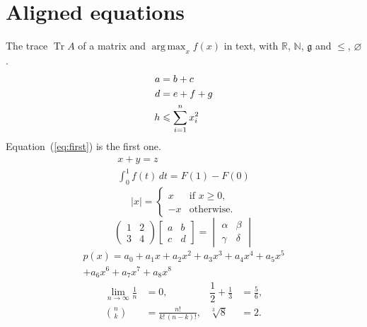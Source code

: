 \documentclass{article}
\DeclareMathOperator{\Tr}{Tr}
\DeclareMathOperator*{\argmax}{arg\,max}
\begin{document}
\section{Aligned equations}
The trace $\Tr A$ of a matrix and $\argmax_x f(x)$ in text, with
$\mathbb{R}$, $\mathbb{N}$, $\mathfrak{g}$ and $\leqslant$, $\varnothing$.
\begin{align}
  a &= b + c \label{eq:first}\\
  d &= e + f + g \notag\\
  h &\leqslant \sum_{i=1}^{n} x_i^2
\end{align}
Equation~(\ref{eq:first}) is the first one.
\begin{gather}
  x + y = z\\
  \int_0^1 f(t)\,dt = F(1) - F(0)
\end{gather}
\begin{equation}
  |x| = \begin{cases} x & \text{if } x \geq 0,\\ -x & \text{otherwise.} \end{cases}
\end{equation}
\begin{equation*}
  \begin{pmatrix} 1 & 2\\ 3 & 4 \end{pmatrix}
  \begin{bmatrix} a & b\\ c & d \end{bmatrix}
  = \begin{vmatrix} \alpha & \beta\\ \gamma & \delta \end{vmatrix}
\end{equation*}
\begin{multline}
  p(x) = a_0 + a_1 x + a_2 x^2 + a_3 x^3 + a_4 x^4 + a_5 x^5\\
  + a_6 x^6 + a_7 x^7 + a_8 x^8
\end{multline}
\begin{align*}
  \lim_{n\to\infty} \frac{1}{n} &= 0, & \dfrac{1}{2} + \tfrac{1}{3} &= \frac56,\\
  \binom{n}{k} &= \frac{n!}{k!\,(n-k)!}, & \sqrt[3]{8} &= 2.
\end{align*}
\end{document}
